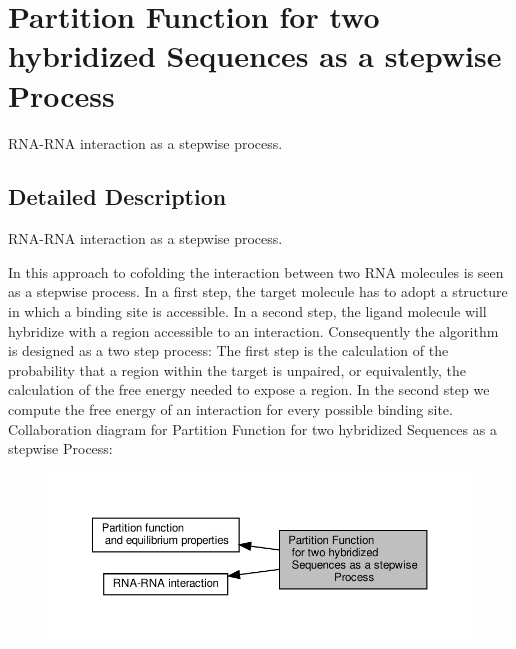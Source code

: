 \hypertarget{group__up__cofold}{}\section{Partition Function for two hybridized Sequences as a stepwise Process}
\label{group__up__cofold}


R\+N\+A-\/\+R\+NA interaction as a stepwise process.  




\subsection{Detailed Description}
R\+N\+A-\/\+R\+NA interaction as a stepwise process. 

In this approach to cofolding the interaction between two R\+NA molecules is seen as a stepwise process. In a first step, the target molecule has to adopt a structure in which a binding site is accessible. In a second step, the ligand molecule will hybridize with a region accessible to an interaction. Consequently the algorithm is designed as a two step process\+: The first step is the calculation of the probability that a region within the target is unpaired, or equivalently, the calculation of the free energy needed to expose a region. In the second step we compute the free energy of an interaction for every possible binding site. Collaboration diagram for Partition Function for two hybridized Sequences as a stepwise Process\+:
\nopagebreak
\begin{figure}[H]
\begin{center}
\leavevmode
\includegraphics[width=350pt]{group__up__cofold}
\end{center}
\end{figure}
